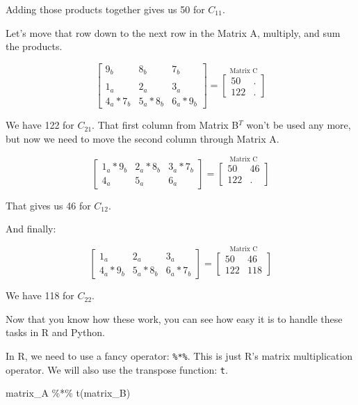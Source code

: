 \documentclass[
  letterpaper,
]{krantz}
\newenvironment{Shaded}{}{}
\newcommand{\FunctionTok}[1]{\textcolor[rgb]{0.02,0.16,0.49}{#1}}
\newcommand{\NormalTok}[1]{#1}
\newcommand{\SpecialCharTok}[1]{\textcolor[rgb]{0.25,0.44,0.63}{#1}}
\begin{document}
Adding those products together gives us 50 for \(C_{11}\).

Let's move that row down to the next row in the Matrix A, multiply, and
sum the products.

\[
\begin{bmatrix}
9_{b} & 8_{b} & 7_{b} \\
\\
1_{a} & 2_{a} & 3_{a}\\
4_{a}*7_{b} & 5_{a}*8_{b} & 6_{a}*9_{b}
\end{bmatrix}
= 
\stackrel{\mbox{Matrix C}}{
\begin{bmatrix}
50 & .\\
122 & .
\end{bmatrix}
}
\]

We have 122 for \(C_{21}\). That first column from Matrix B\(^T\) won't
be used any more, but now we need to move the second column through
Matrix A.

\[
\begin{bmatrix}
1_{a}*9_{b} & 2_{a}*8_{b} & 3_{a}*7_{b}\\
4_{a} & 5_{a} & 6_{a}
\end{bmatrix}
= 
\stackrel{\mbox{Matrix C}}{
\begin{bmatrix}
50 & 46\\
122 & .
\end{bmatrix}
}
\]

That gives us 46 for \(C_{12}\).

And finally:

\[
\begin{bmatrix}
1_{a} & 2_{a} & 3_{a}\\
4_{a}*9_{b} & 5_{a}*8_{b} & 6_{a}*7_{b}
\end{bmatrix}
=
\stackrel{\mbox{Matrix C}}{
\begin{bmatrix}
50 & 46\\
122 & 118
\end{bmatrix}
}
\]

We have 118 for \(C_{22}\).

Now that you know how these work, you can see how easy it is to handle
these tasks in R and Python.

In R, we need to use a fancy operator: \texttt{\%*\%}. This is just R's
matrix multiplication operator. We will also use the transpose function:
\texttt{t}.

\begin{Shaded}
\begin{Highlighting}[]
\NormalTok{matrix\_A }\SpecialCharTok{\%*\%} \FunctionTok{t}\NormalTok{(matrix\_B)}
\end{Highlighting}
\end{Shaded}
\end{document}
